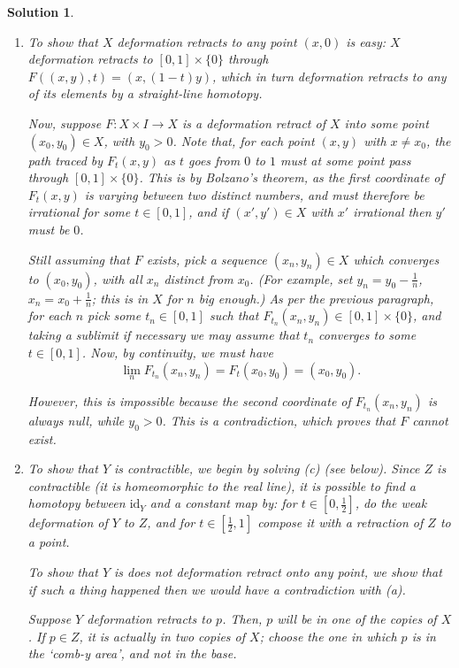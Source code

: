 \documentclass{article}
\theoremstyle{plain}
\theoremstyle{nonumberplain}
\newtheorem{sol}{Solution}
\newcommand{\id}{\mathrm{id}}
\begin{document}
\begin{sol}
\leavevmode
\begin{enumerate}
\item To show that $X$ deformation retracts to any point $(x,0)$ is easy: $X$ deformation retracts to $[0,1] \times \{0\}$ through $F((x,y),t) = (x,(1-t)y)$, which in turn deformation retracts to any of its elements by a straight-line homotopy.

Now, suppose $F \colon X \times I \to X$ is a deformation retract of $X$ into some point $(x_0,y_0) \in X$, with $y_0 > 0$. Note that, for each point $(x,y)$ with $x \neq x_0$, the path traced by $F_t(x,y)$ as $t$ goes from $0$ to $1$ must at some point pass through $[0,1] \times \{0\}$. This is by Bolzano's theorem, as the first coordinate of $F_t(x,y)$ is varying between two distinct numbers, and must therefore be irrational for some $t \in [0,1]$, and if $(x',y') \in X$ with $x'$ irrational then $y'$ must be $0$.

Still assuming that $F$ exists, pick a sequence $(x_n, y_n) \in X$ which converges to $(x_0, y_0)$, with all $x_n$ distinct from $x_0$. (For example, set $y_n = y_0 - \frac1n$, $x_n = x_0 + \frac1n$; this is in $X$ for $n$ big enough.) As per the previous paragraph, for each $n$ pick some $t_n \in [0,1]$ such that $F_{t_n}(x_n,y_n) \in [0,1] \times \{0\}$, and taking a sublimit if necessary we may assume that $t_n$ converges to some $t \in [0,1]$. Now, by continuity, we must have
\begin{equation}
\lim_n F_{t_n}(x_n,y_n) = F_t(x_0,y_0) = (x_0,y_0).
\end{equation}

However, this is impossible because the second coordinate of $F_{t_n}(x_n,y_n)$ is always null, while $y_0 > 0$. This is a contradiction, which proves that $F$ cannot exist.

\item To show that $Y$ is contractible, we begin by solving (c) (see below). Since $Z$ is contractible (it is homeomorphic to the real line), it is possible to find a homotopy between $\id_Y$ and a constant map by: for $t \in [0,\frac12]$, do the weak deformation of $Y$ to $Z$, and for $t \in [\frac12,1]$ compose it with a retraction of $Z$ to a point.

To show that $Y$ is does not deformation retract onto any point, we show that if such a thing happened then we would have a contradiction with (a).

Suppose $Y$ deformation retracts to $p$. Then, $p$ will be in one of the copies of $X$. If $p \in Z$, it is actually in two copies of $X$; choose the one in which $p$ is in the `comb-y area', and not in the base.


\end{enumerate}
\end{sol}
\end{document}
